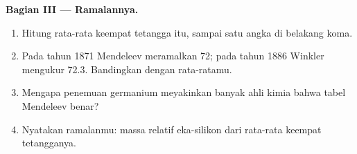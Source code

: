 \begin{problem}
\medskip
\noindent\textbf{Bagian III --- Ramalannya.}
\begin{enumerate}[resume]
  \item Hitung rata-rata keempat tetangga itu, sampai satu angka di
        belakang koma.
  \item Pada tahun 1871 Mendeleev meramalkan 72; pada tahun 1886 Winkler
        mengukur 72.3. Bandingkan dengan rata-ratamu.
  \item Mengapa penemuan germanium meyakinkan banyak ahli kimia bahwa
        tabel Mendeleev benar?
  \item Nyatakan ramalanmu: massa  relatif eka-silikon dari rata-rata keempat
        tetangganya.
\end{enumerate}
\end{problem}
